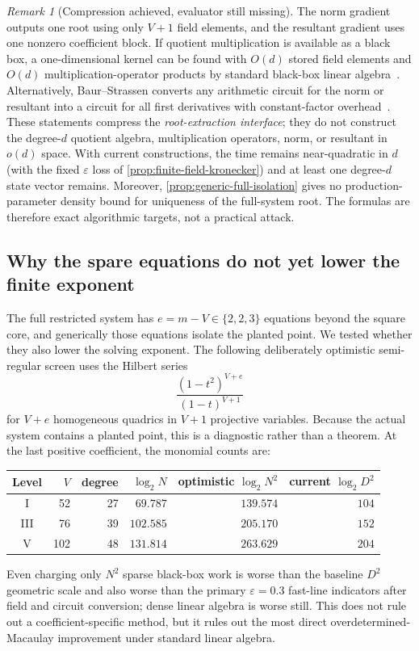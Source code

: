 \documentclass[11pt,a4paper]{article}
\theoremstyle{definition}
\theoremstyle{remark}
\newtheorem{remark}[theorem]{Remark}
\begin{document}
\begin{remark}[Compression achieved, evaluator still missing]\label{rem:implicit-memory}
The norm gradient outputs one root using only $V+1$ field elements, and the resultant gradient uses one nonzero coefficient block.  If quotient multiplication is available as a black box, a one-dimensional kernel can be found with $O(d)$ stored field elements and $O(d)$ multiplication-operator products by standard black-box linear algebra~\cite{Wiedemann}.  Alternatively, Baur--Strassen converts any arithmetic circuit for the norm or resultant into a circuit for all first derivatives with constant-factor overhead~\cite{BaurStrassen}.  These statements compress the \emph{root-extraction interface}; they do not construct the degree-$d$ quotient algebra, multiplication operators, norm, or resultant in $o(d)$ space.  With current constructions, the time remains near-quadratic in $d$ (with the fixed $\varepsilon$ loss of \cref{prop:finite-field-kronecker}) and at least one degree-$d$ state vector remains.  Moreover, \cref{prop:generic-full-isolation} gives no production-parameter density bound for uniqueness of the full-system root.  The formulas are therefore exact algorithmic targets, not a practical attack.
\end{remark}

\subsection{Why the spare equations do not yet lower the finite exponent}\label{subsec:exponent-audit}

The full restricted system has $e=m-V\in\{2,2,3\}$ equations beyond the square core, and generically those equations isolate the planted point.  We tested whether they also lower the solving exponent.  The following deliberately optimistic semi-regular screen uses the Hilbert series
\[
\frac{(1-t^2)^{V+e}}{(1-t)^{V+1}}
\]
for $V+e$ homogeneous quadrics in $V+1$ projective variables.  Because the actual system contains a planted point, this is a diagnostic rather than a theorem.  At the last positive coefficient, the monomial counts are:
\begin{center}
\small
\begin{tabular}{@{}c r r r r r@{}}
\toprule
Level & $V$ & degree & $\log_2 N$ & optimistic $\log_2N^2$ & current $\log_2D^2$\\
\midrule
I   &52  &27 &$69.787$  &$139.574$ &$104$\\
III &76  &39 &$102.585$ &$205.170$ &$152$\\
V   &102 &48 &$131.814$ &$263.629$ &$204$\\
\bottomrule
\end{tabular}
\end{center}
Even charging only $N^2$ sparse black-box work is worse than the baseline $D^2$ geometric scale and also worse than the primary $\varepsilon=0.3$ fast-line indicators after field and circuit conversion; dense linear algebra is worse still.  This does not rule out a coefficient-specific method, but it rules out the most direct overdetermined-Macaulay improvement under standard linear algebra.
\end{document}
